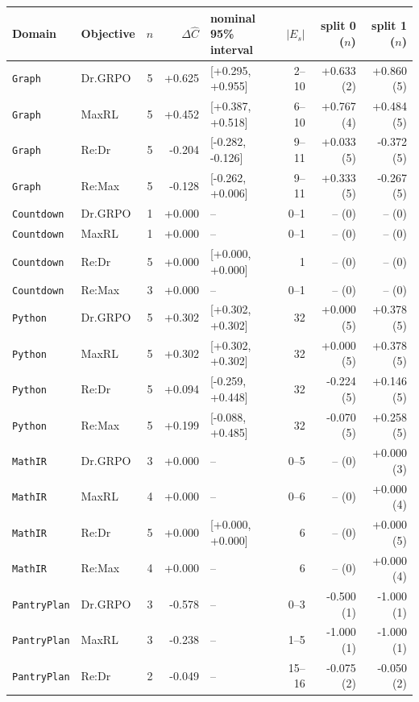 \begin{table}[!htbp]
\centering
\scriptsize
\setlength{\tabcolsep}{3pt}
\begin{tabular}{@{}llcrlrrr@{}}
\toprule
Domain & Objective & $n$ & $\Delta\widehat C$ & nominal 95\% interval & $|E_s|$ & split 0 ($n$) & split 1 ($n$) \\
\midrule
\texttt{Graph} & Dr.GRPO & 5 & +0.625 & [+0.295, +0.955] & 2--10 & +0.633 (2) & +0.860 (5) \\
\texttt{Graph} & MaxRL & 5 & +0.452 & [+0.387, +0.518] & 6--10 & +0.767 (4) & +0.484 (5) \\
\texttt{Graph} & Re:Dr & 5 & -0.204 & [-0.282, -0.126] & 9--11 & +0.033 (5) & -0.372 (5) \\
\texttt{Graph} & Re:Max & 5 & -0.128 & [-0.262, +0.006] & 9--11 & +0.333 (5) & -0.267 (5) \\
\texttt{Countdown} & Dr.GRPO & 1 & +0.000 & -- & 0--1 & -- (0) & -- (0) \\
\texttt{Countdown} & MaxRL & 1 & +0.000 & -- & 0--1 & -- (0) & -- (0) \\
\texttt{Countdown} & Re:Dr & 5 & +0.000 & [+0.000, +0.000] & 1 & -- (0) & -- (0) \\
\texttt{Countdown} & Re:Max & 3 & +0.000 & -- & 0--1 & -- (0) & -- (0) \\
\texttt{Python} & Dr.GRPO & 5 & +0.302 & [+0.302, +0.302] & 32 & +0.000 (5) & +0.378 (5) \\
\texttt{Python} & MaxRL & 5 & +0.302 & [+0.302, +0.302] & 32 & +0.000 (5) & +0.378 (5) \\
\texttt{Python} & Re:Dr & 5 & +0.094 & [-0.259, +0.448] & 32 & -0.224 (5) & +0.146 (5) \\
\texttt{Python} & Re:Max & 5 & +0.199 & [-0.088, +0.485] & 32 & -0.070 (5) & +0.258 (5) \\
\texttt{MathIR} & Dr.GRPO & 3 & +0.000 & -- & 0--5 & -- (0) & +0.000 (3) \\
\texttt{MathIR} & MaxRL & 4 & +0.000 & -- & 0--6 & -- (0) & +0.000 (4) \\
\texttt{MathIR} & Re:Dr & 5 & +0.000 & [+0.000, +0.000] & 6 & -- (0) & +0.000 (5) \\
\texttt{MathIR} & Re:Max & 4 & +0.000 & -- & 6 & -- (0) & +0.000 (4) \\
\texttt{PantryPlan} & Dr.GRPO & 3 & -0.578 & -- & 0--3 & -0.500 (1) & -1.000 (1) \\
\texttt{PantryPlan} & MaxRL & 3 & -0.238 & -- & 1--5 & -1.000 (1) & -1.000 (1) \\
\texttt{PantryPlan} & Re:Dr & 2 & -0.049 & -- & 15--16 & -0.075 (2) & -0.050 (2) \\

\end{tabular}
\end{table}
